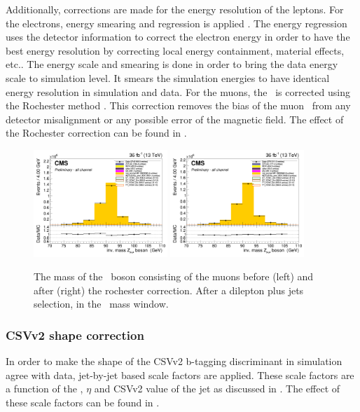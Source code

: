 Additionally, corrections are made for the energy resolution of the leptons. For the electrons, energy smearing and regression is applied \cite{smearing}. The energy regression uses the detector information to correct the electron energy in order to have the best energy resolution by correcting local energy containment, material effects, etc.. The energy scale and smearing is done in order to bring the data energy scale to simulation level. It smears the simulation energies to have identical energy resolution in simulation and data. For the muons, the \pt\ is corrected using the Rochester method \cite{roch,roch2}. This correction removes the bias of the muon \pt\ from any detector misalignment or any possible error of the magnetic field.
The effect of the Rochester correction can be found in .

\begin{figure}[htbp]
	\centering	
	\includegraphics[width=0.45\textwidth]{5_Eventselection/Figures/Reweighing/rochester/2lepcontrol_afterAtLeast1Jet_afterZWindow_ZbosonMassMu_all_Stack_before}
	\includegraphics[width=0.45\textwidth]{5_Eventselection/Figures/Reweighing/rochester/2lepcontrol_afterAtLeast1Jet_afterZWindow_ZbosonMassMu_all_Stack_after}
	
	\caption{The mass of the \PZ\ boson consisting of the muons before (left) and after (right) the rochester correction. After a dilepton plus jets selection, in the \PZ\ mass window.}
	\label{fig:roch}
\end{figure}
\newpage
\subsubsection*{CSVv2 shape correction}
In order to make the shape of the CSVv2 b-tagging discriminant in simulation agree with data,  jet-by-jet based scale factors are applied. These scale factors are a function of the \pt, $\eta$ and CSVv2 value of the jet as discussed in .  The effect of these scale factors can be found in .


